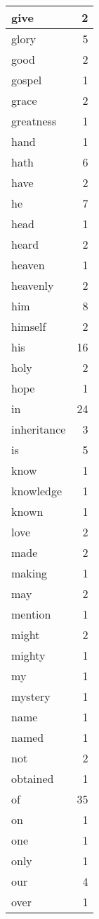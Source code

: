 \begin{center}
\begin{longtable}{l|r}
give & 2\\ \hline 
glory & 5\\ \hline 
good & 2\\ \hline 
gospel & 1\\ \hline 
grace & 2\\ \hline 
greatness & 1\\ \hline 
hand & 1\\ \hline 
hath & 6\\ \hline 
have & 2\\ \hline 
he & 7\\ \hline 
head & 1\\ \hline 
heard & 2\\ \hline 
heaven & 1\\ \hline 
heavenly & 2\\ \hline 
him & 8\\ \hline 
himself & 2\\ \hline 
his & 16\\ \hline 
holy & 2\\ \hline 
hope & 1\\ \hline 
in & 24\\ \hline 
inheritance & 3\\ \hline 
is & 5\\ \hline 
know & 1\\ \hline 
knowledge & 1\\ \hline 
known & 1\\ \hline 
love & 2\\ \hline 
made & 2\\ \hline 
making & 1\\ \hline 
may & 2\\ \hline 
mention & 1\\ \hline 
might & 2\\ \hline 
mighty & 1\\ \hline 
my & 1\\ \hline 
mystery & 1\\ \hline 
name & 1\\ \hline 
named & 1\\ \hline 
not & 2\\ \hline 
obtained & 1\\ \hline 
of & 35\\ \hline 
on & 1\\ \hline 
one & 1\\ \hline 
only & 1\\ \hline 
our & 4\\ \hline 
over & 1\\ \hline 

\end{longtable}
\end{center}
